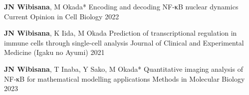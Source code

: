 
\begin{cventries}

  \cventrypub
    {\textbf{JN Wibisana}, M Okada*} %
    {Encoding and decoding NF-κB nuclear dynamics} %
    {Current Opinion in Cell Biology} %
    {2022} %

  \cventrypublast
    {\textbf{JN Wibisana}, K Iida, M Okada} %
    {Prediction of transcriptional regulation in immune cells through single-cell analysis} %
    {Journal of Clinical and Experimental Medicine (Igaku no Ayumi)} %
    {2021} %


\end{cventries}
  


\begin{cventries}

  \cventrypublast
    {\textbf{JN Wibisana}, T Inaba, Y Sako, M Okada*} %
    {Quantitative imaging analysis of NF-κB for mathematical modelling applications} %
    {Methods in Molecular Biology} %
    {2023} %


\end{cventries}